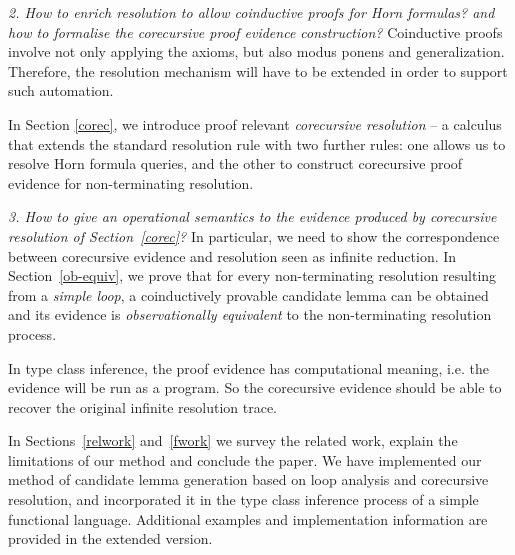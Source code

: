 \documentclass{llncs}
\begin{document}
\textit{2. How to enrich resolution to allow coinductive proofs for Horn formulas? and how to formalise the corecursive proof evidence construction?} Coinductive proofs involve not 
only applying the axioms, but also modus ponens and generalization. Therefore, the resolution
mechanism will have to be extended in order to support such automation.   

\noindent In Section \ref{corec}, we introduce proof relevant \emph{corecursive resolution} -- a calculus that extends the standard resolution rule with two further rules:
one allows us to resolve Horn formula queries, and the other to construct corecursive proof evidence  for non-terminating resolution.



\emph{3. How to give an operational semantics to the evidence produced by corecursive resolution of Section~\ref{corec}?}
  In particular, we need to show the correspondence between corecursive evidence and resolution seen as infinite reduction.
  In Section~\ref{ob-equiv}, we prove that for every non-terminating resolution resulting from a \textit{simple loop}, a coinductively provable
 candidate lemma can be obtained and its evidence is \textit{observationally equivalent} to the non-terminating resolution process.

\noindent In type class inference, the proof evidence has computational meaning, i.e. the evidence will be run as a program. So the corecursive evidence should be able to recover the original infinite resolution trace.




In Sections~\ref{relwork} and~\ref{fwork} we survey the related work, explain the limitations of our method and conclude the paper. 
We have implemented our method of candidate lemma generation based on loop analysis and corecursive
resolution, and incorporated it in the type class inference process of a simple
functional language. Additional examples and implementation information are provided in the extended version. 










\begin{comment}

\emph{Introducing a method for richer coinductive hypothesis formation for proofs by resolution in Horn clause logic is the first contribution of this paper.}
A heuristic method for the coinductive  hypothesis search is introduced in Section~\ref{inv}. Proofs of coinductive soundness of such hypotheses require two extensions to SLD-resolution rule:
\begin{itemize}
\item  allowing Horn-Clauses, not just atomic clauses, to be resolvents;
 \item  introduction of a coinductive inference rule on top of the resolution rule.
   Both of these extensuons are given in Section~\ref{corec}.
   \end{itemize}

\end{comment}
\end{document}
